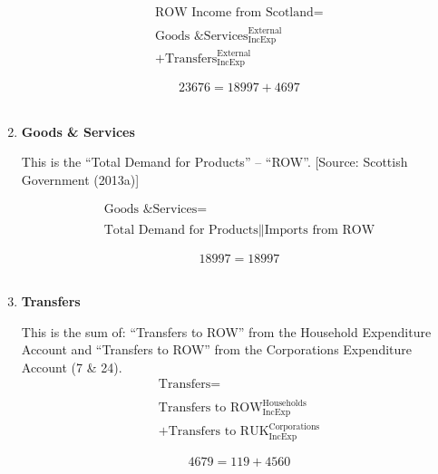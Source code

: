 \begin{enumerate}
\begin{equation}
\begin{split}
\text{ROW Income from Scotland} =  \\ \\
\text{Goods \& Services}^\text{External}_\text{IncExp}\\
+\text{Transfers}^\text{External}_\text{IncExp}
\end{split} \label{eq:2.5.58}
\end{equation}

\begin{equation} \nonumber
23676 = 18997+4697
\end{equation}\\


\item \textbf {Goods \& Services}

This is the “Total Demand for Products” – “ROW”. [Source: Scottish Government (2013a)]

\begin{equation}
\begin{split}
\text{Goods \& Services} =  \\ \\
\text{Total Demand for Products}\|\text{Imports from ROW}
\end{split} \label{eq:2.5.59}
\end{equation}

\begin{equation} \nonumber
18997 = 18997
\end{equation}\\


\item \textbf {Transfers}

This is the sum of: “Transfers to ROW” from the Household Expenditure Account and “Transfers to ROW” from the Corporations Expenditure Account (7 \& 24).\\

\begin{equation}
\begin{split}
\text{Transfers} =  \\ \\
\text{Transfers to ROW}^\text{Households}_\text{IncExp}\\
+\text{Transfers to RUK}^\text{Corporations}_\text{IncExp}
\end{split} \label{eq:2.5.60}
\end{equation}

\begin{equation} \nonumber
4679 = 119+4560
\end{equation}\\



\end{enumerate}
